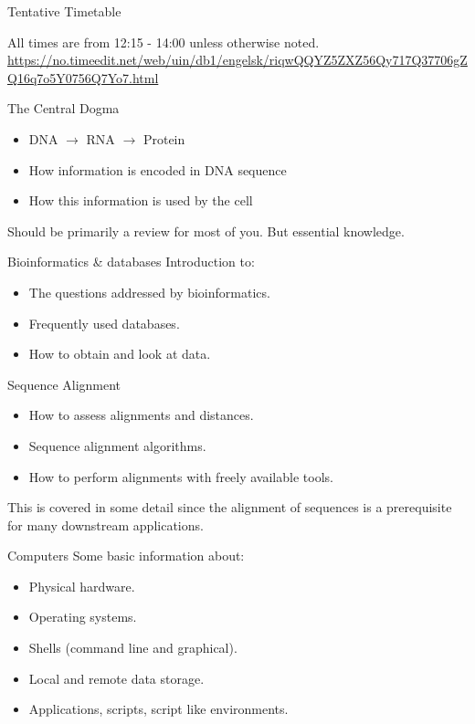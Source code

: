 \documentclass[pdf]{beamer}
\begin{document}
\begin{frame}{Tentative Timetable}
\vspace*{-0.4cm}                        
\begin{figure}[ht]
  \tiny
  
  \end{figure}
  \vspace*{+0.03cm}
  {\tiny
  All times are from 12:15 - 14:00 unless otherwise noted.
  \url{https://no.timeedit.net/web/uin/db1/engelsk/riqwQQYZ5ZXZ56Qy717Q37706gZQ16q7o5Y0756Q7Yo7.html}
  }
\end{frame}

\begin{frame}{The Central Dogma}
  \begin{itemize}
    \item DNA $\rightarrow$ RNA $\rightarrow$ Protein
    \item How information is encoded in DNA sequence
    \item How this information is used by the cell
  \end{itemize}
  
  Should be primarily a review for most of you. But essential knowledge.
\end{frame}

\begin{frame}{Bioinformatics \& databases}
  Introduction to:
  \begin{itemize}
    \item The questions addressed by bioinformatics.
    \item Frequently used databases.
    \item How to obtain and look at data.
  \end{itemize}
\end{frame}

\begin{frame}{Sequence Alignment}
  \begin{itemize}
    \item How to assess alignments and distances.
    \item Sequence alignment algorithms.
    \item How to perform alignments with freely available tools.
  \end{itemize}
  This is covered in some detail since the alignment of sequences is
  a prerequisite for many downstream applications.
\end{frame}

\begin{frame}{Computers}
  Some basic information about:
  \begin{itemize}
    \item Physical hardware.
    \item Operating systems.
    \item Shells (command line and graphical).
    \item Local and remote data storage.
    \item Applications, scripts, script like environments.
   \end{itemize}
\end{frame}
\end{document}
